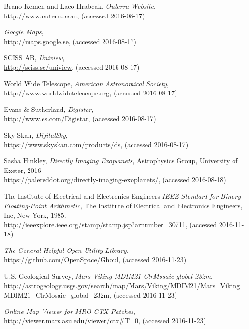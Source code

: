 \begin{thebibliography}{99}
  Brano Kemen and Laco Hrabcak,
  \emph{Outerra Website},
  \\
  \url{http://www.outerra.com},
  (accessed 2016-08-17)
  
  \emph{Google Maps},
  \\
  \url{http://maps.google.se},
  (accessed 2016-08-17)
  
  SCISS AB,
  \emph{Uniview},
  \\
  \url{http://sciss.se/uniview},
  (accessed 2016-08-17)
  
  World Wide Telescope,
  \emph{American Astronomical Society},
  \\
  \url{http://www.worldwidetelescope.org},
  (accessed 2016-08-17)
  
  Evans \& Sutherland,
  \emph{Digistar},
  \\
  \url{http://www.es.com/Digistar},
  (accessed 2016-08-17)
    
  Sky-Skan,
  \emph{DigitalSky},
  \\
  \url{https://www.skyskan.com/products/ds},
  (accessed 2016-08-17)
    
  Sasha Hinkley,
  \emph{Directly Imaging Exoplanets},
  Astrophysics Group, University of Exeter,
  2016 \\
  \url{https://palereddot.org/directly-imaging-exoplanets/},
  (accessed 2016-08-18)
  
  The Institute of Electrical and Electronics Engineers
  \emph{IEEE Standard for Binary Floating-Point Arithmetic},
  The Institute of Electrical and Electronics Engineers, Inc,
  New York,
  1985. \\
  \url{http://ieeexplore.ieee.org/stamp/stamp.jsp?arnumber=30711},
  (accessed 2016-11-18)
  
  \emph{The General Helpful Open Utility Library},
  \\
  \url{https://github.com/OpenSpace/Ghoul},
  (accessed 2016-11-23)
  
  U.S. Geological Survey,
  \emph{Mars Viking MDIM21 ClrMosaic global 232m},
  \\
  \url{http://astrogeology.usgs.gov/search/map/Mars/Viking/MDIM21/Mars_Viking_MDIM21_ClrMosaic_global_232m},
  (accessed 2016-11-23)
  
  \emph{Online Map Viewer for MRO CTX Patches},
  \\
  \url{http://viewer.mars.asu.edu/viewer/ctx#T=0},
  (accessed 2016-11-23)
  

\end{thebibliography}
